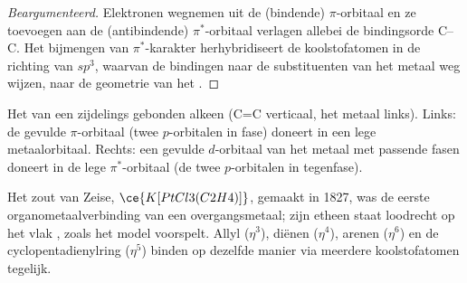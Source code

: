 \begin{proof}[Beargumenteerd]
Elektronen wegnemen uit de (bindende) $\pi$-orbitaal en ze toevoegen aan de (antibindende) $\pi^*$-orbitaal
verlagen allebei de bindingsorde C--C. Het bijmengen van $\pi^*$-karakter
herhybridiseert de koolstofatomen in de richting van $sp^3$, waarvan de bindingen naar de substituenten
van het metaal weg wijzen, naar de geometrie van het .
\end{proof}

\begin{omfigure}

{\small Het  van een zijdelings gebonden
alkeen (C=C
verticaal, het metaal links). Links: de gevulde $\pi$-orbitaal (twee $p$-orbitalen in
fase) doneert in een lege metaalorbitaal. Rechts: een gevulde $d$-orbitaal van het metaal
met passende fasen doneert in de lege $\pi^*$-orbitaal (de twee $p$-orbitalen in
tegenfase).}
\end{omfigure}

Het zout van Zeise, $\ce{K[PtCl3(C2H4)]}$, gemaakt in 1827, was de eerste organometaalverbinding
van een overgangsmetaal; zijn etheen staat loodrecht op het vlak , zoals
het model voorspelt. Allyl ($\eta^3$), diënen ($\eta^4$), arenen ($\eta^6$) en de cyclopentadienylring ($\eta^5$) binden op dezelfde manier via meerdere koolstofatomen tegelijk.

